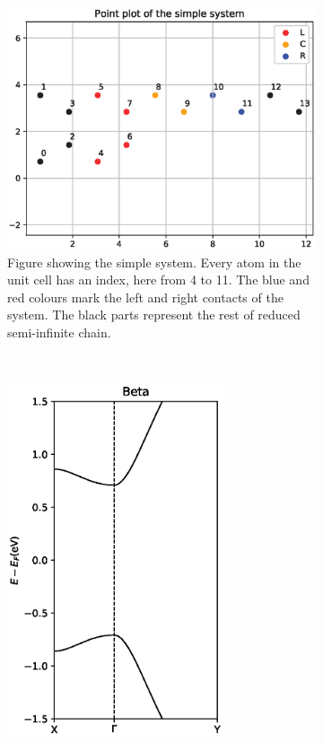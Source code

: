 \begin{figure}[h]
	\centering
	\begin{subfigure}[b]{0.45\textwidth}
		\includegraphics[width=\textwidth]{Figures/pointplot.eps}
		\caption{Figure showing the simple system. Every atom in the unit cell has an index, here from 4 to 11. The blue and red colours mark the left and right contacts of the system. The black parts represent the rest of reduced semi-infinite chain.}
		\label{pointplot}
	\end{subfigure}
	~ %
	\begin{subfigure}[b]{0.45\textwidth}
		\includegraphics[width=0.7\textwidth]{Figures/BetaBandstructures.eps}

\end{subfigure}
\end{figure}
